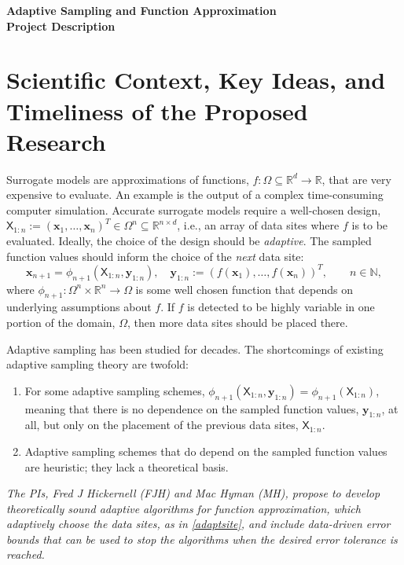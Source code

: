 \documentclass[11pt]{NSFamsart}
\newcommand{\reals}{{\mathbb{R}}}
\newcommand{\naturals}{{\mathbb{N}}}
\newcommand{\mX}{\mathsf{X}}
\newcommand{\bx}{{\boldsymbol{x}}}
\newcommand{\by}{{\boldsymbol{y}}}
\newcommand{\shortnoy}{For some adaptive sampling schemes, $\phi_{n+1}(\mX_{1:n},\by_{1:n}) = \phi_{n+1}(\mX_{1:n})$, meaning that there is no dependence on the sampled function values, $\by_{1:n}$, at all, but only on the placement of the previous data sites, $\mX_{1:n}$.}
\newcommand{\shortheuristic}{Adaptive sampling schemes that do depend on the sampled function values are heuristic; they lack a theoretical basis.}
\begin{document}

\begin{center}
\Large \textbf{Adaptive Sampling and Function Approximation \\ Project Description}
\end{center}
\vspace{-2ex}

\setcounter{tocdepth}{1}
\tableofcontents

\vspace{-6ex}

\section{Scientific Context, Key Ideas, and Timeliness of the Proposed Research}
Surrogate models are approximations of functions, $f: \Omega \subseteq \reals^d \to \reals$, that are very expensive to evaluate.  An example is the output of a complex time-consuming computer simulation.  Accurate surrogate models require a well-chosen design, $\mX_{1:n} := (\bx_1, \ldots, \bx_n)^T \in \Omega^{n} \subseteq \reals^{n \times d}$, i.e., an array of data sites where $f$ is to be evaluated.  Ideally, the choice of the design should be \emph{adaptive}. The sampled function values should inform the choice of the \emph{next} data site: 
\begin{equation} \label{adaptsite}
    \bx_{n+1} = \phi_{n+1}(\mX_{1:n},\by_{1:n}), \quad \by_{1:n} := (f(\bx_1), \ldots, f(\bx_n))^T, \qquad n \in \naturals,
\end{equation}
where $\phi_{n+1} : \Omega^{n} \times \reals^n \to \Omega$ is some well chosen function that depends on underlying assumptions about $f$.  If $f$ is detected to be highly variable in one portion of the domain, $\Omega$, then more data sites should be placed there. 

Adaptive sampling has been studied for decades.  The shortcomings of existing adaptive sampling theory are twofold:
\begin{enumerate}[widest = Shortcomingj, leftmargin =*]
\renewcommand{\labelenumi}{Shortcoming \arabic{enumi}.}
    \item \shortnoy \label{shortcomenoy}
    
    \item \shortheuristic
    
\end{enumerate}
\emph{The PIs, Fred J Hickernell (FJH) and Mac Hyman (MH), propose to develop theoretically sound adaptive algorithms for function approximation, which adaptively choose the data sites, as in \eqref{adaptsite}, and include data-driven error bounds that can be used to stop the algorithms when the desired error tolerance is reached.}
\end{document}
